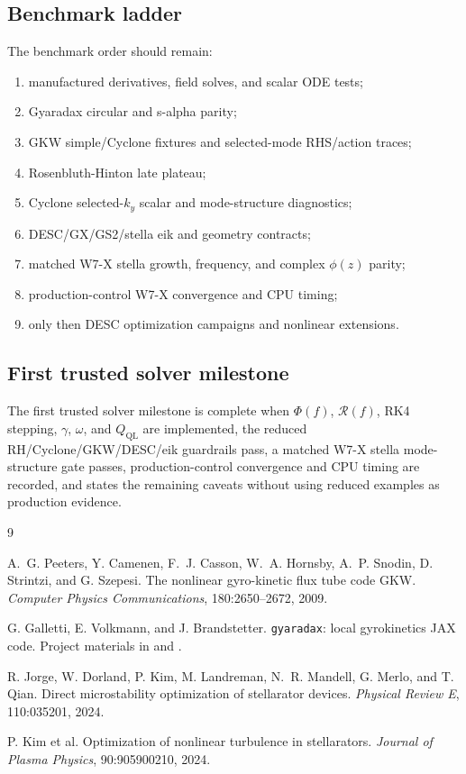 \documentclass[11pt,a4paper]{article}
\newcommand{\RHS}{\mathcal{R}}
\begin{document}
\subsection{Benchmark ladder}

The benchmark order should remain:
\begin{enumerate}
  \item manufactured derivatives, field solves, and scalar ODE tests;
  \item Gyaradax circular and s-alpha parity;
  \item GKW simple/Cyclone fixtures and selected-mode RHS/action traces;
  \item Rosenbluth-Hinton late plateau;
  \item Cyclone selected-\(k_y\) scalar and mode-structure diagnostics;
  \item DESC/GX/GS2/stella eik and geometry contracts;
  \item matched W7-X stella growth, frequency, and complex \(\phi(z)\) parity;
  \item production-control W7-X convergence and CPU timing;
  \item only then DESC optimization campaigns and nonlinear extensions.
\end{enumerate}

\subsection{First trusted solver milestone}

The first trusted solver milestone is complete when \(\Phi(f)\), \(\RHS(f)\),
RK4 stepping, \(\gamma\), \(\omega\), and \(Q_{\mathrm{QL}}\) are implemented,
the reduced RH/Cyclone/GKW/DESC/eik guardrails pass, a matched W7-X stella
mode-structure gate passes, production-control convergence and CPU timing are
recorded, and  states the remaining caveats without using
reduced examples as production evidence.

\begin{thebibliography}{9}

A.~G. Peeters, Y. Camenen, F.~J. Casson, W.~A. Hornsby, A.~P. Snodin, D. Strintzi, and G. Szepesi.
\newblock The nonlinear gyro-kinetic flux tube code GKW.
\newblock \emph{Computer Physics Communications}, 180:2650--2672, 2009.

G. Galletti, E. Volkmann, and J. Brandstetter.
\newblock \texttt{gyaradax}: local gyrokinetics JAX code.
\newblock Project materials in  and .

R. Jorge, W. Dorland, P. Kim, M. Landreman, N.~R. Mandell, G. Merlo, and T. Qian.
\newblock Direct microstability optimization of stellarator devices.
\newblock \emph{Physical Review E}, 110:035201, 2024.

P. Kim et al.
\newblock Optimization of nonlinear turbulence in stellarators.
\newblock \emph{Journal of Plasma Physics}, 90:905900210, 2024.

\end{thebibliography}
\end{document}

